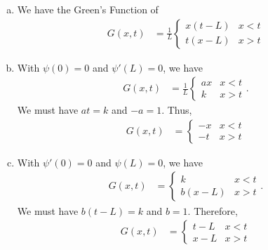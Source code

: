 \documentclass[10pt]{mypackage}
\begin{document}
\begin{solution}[42.1]\hfill
  \begin{enumerate}[(a)]
    \item We have the Green's Function of
      \begin{align*}
        G\left( x,t \right) &= \frac{1}{L} \begin{cases}
          x\left( t-L \right) & x < t\\
          t\left( x-L \right) & x > t
        \end{cases}
      \end{align*}
    \item With $\psi\left( 0 \right) = 0$ and $\psi'\left( L \right) = 0$, we have
      \begin{align*}
        G\left( x,t \right) &= \frac{1}{L} \begin{cases}
          ax & x < t\\
          k & x > t
        \end{cases}.
      \end{align*}
      We must have $at = k$ and $-a = 1$. Thus,
      \begin{align*}
        G\left( x,t \right) &= \begin{cases}
          -x & x < t\\
          -t & x > t
        \end{cases}
      \end{align*}
    \item With $\psi'(0) = 0$ and $\psi(L) = 0$, we have
      \begin{align*}
        G\left( x,t \right) &= \begin{cases}
          k & x < t\\
          b\left( x-L \right) & x > t
        \end{cases}.
      \end{align*}
      We must have $b\left( t-L \right) = k$ and $b = 1$. Therefore,
      \begin{align*}
        G\left( x,t \right) &= \begin{cases}
          t-L & x < t\\
          x-L & x > t
        \end{cases}
      \end{align*}
  \end{enumerate}
\end{solution}
\end{document}
